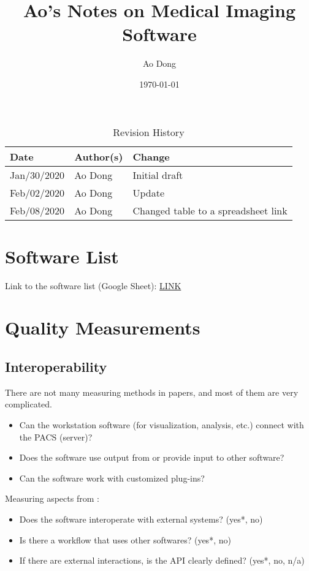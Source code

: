 \documentclass{article}
\title{Ao's Notes on Medical Imaging Software}
\author{Ao Dong}
\date{\today}
\begin{document}
\maketitle

\begin{table}[hp]
\caption{Revision History} \label{TblRevisionHistory}
\begin{tabularx}{\textwidth}{llX}
\toprule
\textbf{Date} & \textbf{Author(s)} & \textbf{Change}\\
\midrule
Jan/30/2020 & Ao Dong & Initial draft\\
Feb/02/2020 & Ao Dong & Update\\
Feb/08/2020 & Ao Dong & Changed table to a spreadsheet link\\
\bottomrule
\end{tabularx}
\end{table}

\section{Software List}


Link to the software list (Google Sheet): \href{https://docs.google.com/spreadsheets/d/122wU0v3ZtvDcqy8C4zKJ89kU-8fXAbo3Mzn6vcVXOi0/edit?usp=sharing}{LINK}

\section{Quality Measurements}

\subsection{Interoperability}
There are not many measuring methods in papers, and most of them are very
complicated.
\begin{itemize}
\item Can the workstation software (for visualization, analysis, etc.) connect
with the PACS (server)?
    \item Does the software use output from or provide input to other software?
    \item Can the software work with customized plug-ins? 
\end{itemize}

\noindent Measuring aspects from \citep{SmithEtAl2018}:
\begin{itemize}
    \item Does the software interoperate with external systems? ({yes*, no})
    \item Is there a workflow that uses other softwares? ({yes*, no})
\item If there are external interactions, is the API clearly defined? ({yes*,
no, n/a})
\end{itemize}
\end{document}
